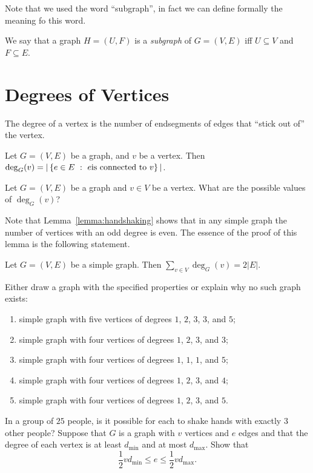 Note that we used the word ``subgraph'', in fact we can define formally the
meaning fo this word.
\begin{definition}
  We say that a graph $H = (U, F)$ is a \emph{subgraph} of $G = (V, E)$ iff
  $U \subseteq V$ and $F \subseteq E$.
\end{definition}

\section{Degrees of Vertices}
The degree of a vertex is the number of endsegments of edges that ``stick out
of'' the vertex.
\begin{definition}
  Let $G = (V, E)$ be a graph, and $v$ be a vertex. Then
  $\deg_G(v) = |\set[{e \text{is connected to } v}]{e \in E}|$.
\end{definition}

\begin{exercise}
  Let $G = (V, E)$ be a graph and $v \in V$ be a vertex.
  What are the possible values of $\deg_G(v)$?
\end{exercise}

Note that Lemma~\ref{lemma:handshaking} shows that in any simple graph the
number of vertices with an odd degree is even.
The essence of the proof of this lemma is the following statement.
\begin{theorem}
  Let $G = (V, E)$ be a simple graph. Then $\sum_{v \in V} \deg_G(v) = 2|E|$.
\end{theorem}

\begin{chapterendexercises}
  \exercise Either draw a graph with the specified properties or explain why
    no such graph exists:
    \begin{enumerate}[nolistsep]
      \item simple graph with five vertices of degrees $1$, $2$, $3$, $3$,
        and $5$;
      \item simple graph with four vertices of degrees $1$, $2$, $3$, and $3$;
      \item simple graph with four vertices of degrees $1$, $1$, $1$, and $5$;
      \item simple graph with four vertices of degrees $1$, $2$, $3$, and $4$;
      \item simple graph with four vertices of degrees $1$, $2$, $3$, and $5$.
    \end{enumerate}
  \exercise In a group of $25$ people, is it possible for each to shake hands
    with exactly $3$ other people?
  \exercise Suppose that $G$ is a graph with $v$ vertices and $e$ edges and
    that the degree of each vertex is at least $d_\mathrm{min}$ and at most
    $d_\mathrm{max}$. Show that
    \[
      \frac{1}{2} v d_\mathrm{min} \le e \le \frac{1}{2} v d_\mathrm{max}.
    \]
\end{chapterendexercises}
